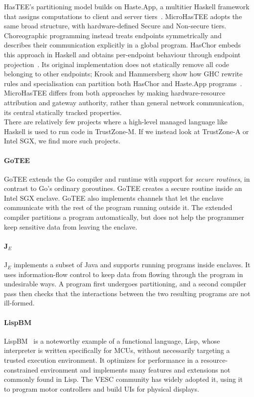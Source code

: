 \documentclass[sigconf]{acmart}
\begin{document}
HasTEE's partitioning model builds on Haste.App, a multitier Haskell framework that assigns computations to client and server tiers~\cite{DBLP:conf/haskell/EkbladC14}.
MicroHasTEE adopts the same broad structure, with hardware-defined Secure and Non-secure tiers.
Choreographic programming instead treats endpoints symmetrically and describes their communication explicitly in a global program.
HasChor embeds this approach in Haskell and obtains per-endpoint behaviour through endpoint projection~\cite{DBLP:journals/pacmpl/ShenKK23}.
Its original implementation does not statically remove all code belonging to other endpoints; Krook and Hammersberg show how GHC rewrite rules and specialisation can partition both HasChor and Haste.App programs~\cite{DBLP:conf/haskell/KrookH24}.
MicroHasTEE differs from both approaches by making hardware-resource attribution and gateway authority, rather than general network communication, its central statically tracked properties.\\

There are relatively few projects where a high-level managed language like Haskell is used to run code in TrustZone-M.
If we instead look at TrustZone-A or Intel SGX, we find more such projects.

\paragraph{GoTEE}
GoTEE\cite{DBLP:conf/usenix/GhosnLB19} extends the Go compiler and runtime with support for \textit{secure routines}, in contrast to Go's ordinary goroutines.
GoTEE creates a secure routine inside an Intel SGX enclave.
GoTEE also implements channels that let the enclave communicate with the rest of the program running outside it.
The extended compiler partitions a program automatically, but does not help the programmer keep sensitive data from leaving the enclave.

\paragraph{J\(_{E}\)}
J\(_{E}\)\cite{DBLP:conf/csfw/OakABS21} implements a subset of Java and supports running programs inside enclaves.
It uses information-flow control to keep data from flowing through the program in undesirable ways.
A program first undergoes partitioning, and a second compiler pass then checks that the interactions between the two resulting programs are not ill-formed.

\paragraph{LispBM}
LispBM~\cite{lispbm} is a noteworthy example of a functional language, Lisp,  whose interpreter is written specifically for MCUs, without necessarily targeting a trusted execution environment.
It optimizes for performance in a resource-constrained environment and implements many features and extensions not commonly found in Lisp.
The VESC community has widely adopted it, using it to program motor controllers and build UIs for physical displays.
\end{document}
